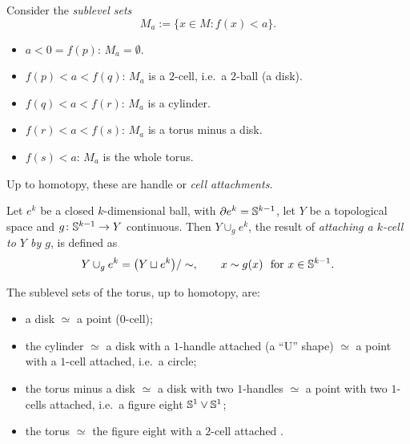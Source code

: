Consider the \emph{sublevel sets}
\[
  M_a:=\{x\in M: f(x)<a\}.
\]
\begin{itemize}
  \item $a<0=f(p)$: $M_a=\emptyset$.
  \item $f(p)<a<f(q)$: $M_a$ is a $2$-cell, i.e.\ a $2$-ball (a disk).
  \item $f(q)<a<f(r)$: $M_a$ is a cylinder.
  \item $f(r)<a<f(s)$: $M_a$ is a torus minus a disk.
  \item $f(s)<a$: $M_a$ is the whole torus.
\end{itemize}

Up to homotopy, these are handle or \emph{cell attachments}.

\begin{definition}
\label{L07:def:cell}
Let $e^k$ be a closed $k$-dimensional ball, with $\partial e^k=\mathbb{S}^{k-1}$, let $Y$ be a
topological space and $g\colon\mathbb{S}^{k-1}\to Y$ continuous. Then $Y\cup_g e^k$, the result
of \emph{attaching a $k$-cell to $Y$ by $g$}, is defined as
\[
  Y\cup_g e^k=\big(Y\sqcup e^k\big)/\sim,
  \qquad x\sim g(x)\ \text{ for } x\in\mathbb{S}^{k-1}.
\]
\end{definition}

The sublevel sets of the torus, up to homotopy, are:
\begin{itemize}
  \item a disk $\simeq$ a point ($0$-cell);
  \item the cylinder $\simeq$ a disk with a $1$-handle attached (a ``U'' shape)
    $\simeq$ a point with a $1$-cell attached, i.e.\ a circle;
  \item the torus minus a disk $\simeq$ a disk with two $1$-handles
    $\simeq$ a point with two $1$-cells attached, i.e.\ a figure eight
    $\mathbb{S}^1\vee\mathbb{S}^1$;
  \item the torus $\simeq$ the figure eight with a $2$-cell attached
    .
\end{itemize}

